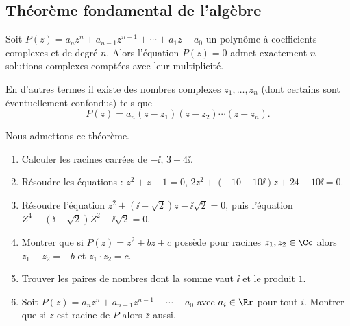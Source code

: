 \documentclass[class=report,crop=false]{standalone}
\begin{document}
\subsection{Théorème fondamental de l'algèbre}

\begin{theoreme}
Soit $P (z) = a_n z^n + a_{n - 1} z^{n - 1}
  + \cdots + a_1 z + a_0$ un polyn\^ome \`a coefficients complexes
  et de degré $n$. Alors l'équation $P(z) = 0$ admet exactement $n$
  solutions complexes comptées avec leur multiplicité.

  En d'autres termes il existe des nombres complexes $z_1, \ldots, z_n$ (dont certains sont
  éventuellement confondus) tels que
  \[ P (z) = a_n  \left( z - z_1 \right) \left( z - z_2 \right)
     \cdots \left( z - z_n \right) . \]
\end{theoreme}

Nous admettons ce théorème.



\begin{miniexercices}
\sauteligne
\begin{enumerate}
  \item Calculer les racines carrées de $-\ii$, $3-4\ii$.
  \item Résoudre les équations : $z^2+z-1=0$, $2z^2 + (-10-10\ii)z+24-10\ii = 0$.
  \item Résoudre l'équation $z^2+(\ii-\sqrt 2)z-\ii\sqrt 2=0$, puis l'équation $Z^4+(\ii-\sqrt 2)Z^2-\ii\sqrt 2=0$.
  \item Montrer que si $P(z)=z^2+bz+c$ possède pour racines $z_1, z_2 \in \Cc$ alors
$z_1+z_2=-b$ et $z_1 \cdot z_2 = c$.
  \item Trouver les paires de nombres dont la somme vaut $\ii$ et le produit $1$.
  \item Soit $P (z) = a_n z^n + a_{n - 1} z^{n - 1} + \cdots  + a_0$ avec $a_i \in \Rr$ pour tout $i$.
Montrer que si $z$ est racine de $P$ alors $\bar z$ aussi.
\end{enumerate}
\end{miniexercices}


\end{document}

